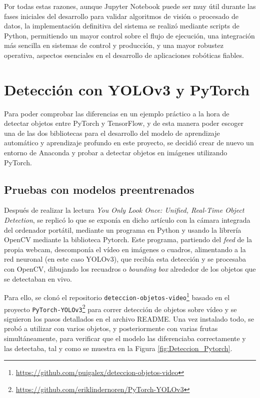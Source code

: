 Por todas estas razones, aunque Jupyter Notebook puede ser muy útil durante las fases iniciales del desarrollo para validar algoritmos de visión o procesado de datos, la implementación definitiva del sistema se realizó mediante scripts de Python, permitiendo un mayor control sobre el flujo de ejecución, una integración más sencilla en sistemas de control y producción, y una mayor robustez operativa, aspectos esenciales en el desarrollo de aplicaciones robóticas fiables.

\pagebreak
\section{Detección con YOLOv3 y PyTorch}
\label{exp_seleccion_algoritmo}

Para poder comprobar las diferencias en un ejemplo práctico a la hora de detectar objetos entre PyTorch y TensorFlow, y de esta manera poder escoger una de las dos bibliotecas para el desarrollo del modelo de aprendizaje automático y aprendizaje profundo en este proyecto, se decidió crear de nuevo un entorno de Anaconda y probar a detectar objetos en imágenes utilizando PyTorch.

\subsection{Pruebas con modelos preentrenados}
\label{sec:Pruebas_modelo_preentrenado_Pytorch}

Después de realizar la lectura \textit{You Only Look Once: Unified, Real-Time Object Detection}\cite{Redmon16}, se replicó lo que se exponía en dicho artículo con la cámara integrada del ordenador portátil, mediante un programa en Python y usando la librería OpenCV mediante la biblioteca Pytorch. Este programa, partiendo del \textit{feed} de la propia webcam, descomponía el vídeo en imágenes o cuadros, alimentando a la red neuronal (en este caso YOLOv3), que recibía esta detección y se procesaba con OpenCV, dibujando los recuadros o \textit{bounding box} alrededor de los objetos que se detectaban en vivo.

Para ello, se clonó el repositorio \verb|deteccion-objetos-video|\footnote{\url{https://github.com/puigalex/deteccion-objetos-video}} basado en el proyecto \verb|PyTorch-YOLOv3|\footnote{\url{https://github.com/eriklindernoren/PyTorch-YOLOv3}} para correr detección de objetos sobre vídeo y se siguieron los pasos detallados en el archivo README.
Una vez instalado todo, se probó a utilizar con varios objetos, y posteriormente con varias frutas simultáneamente, para verificar que el modelo las diferenciaba correctamente y las detectaba, tal y como se muestra en la Figura \ref{fig:Deteccion_Pytorch}.

